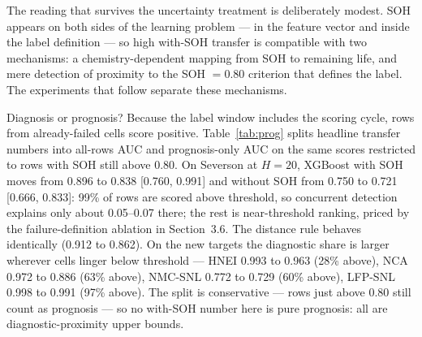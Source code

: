 \documentclass[preprint,12pt]{elsarticle}
\begin{document}
The reading that survives the uncertainty treatment is deliberately modest. SOH appears on both sides of the learning problem --- in the feature vector and inside the label definition --- so high with-SOH transfer is compatible with two mechanisms: a chemistry-dependent mapping from SOH to remaining life, and mere detection of proximity to the SOH $=0.80$ criterion that defines the label. The experiments that follow separate these mechanisms.

Diagnosis or prognosis? Because the label window includes the scoring cycle, rows from already-failed cells score positive. Table~\ref{tab:prog} splits headline transfer numbers into all-rows AUC and prognosis-only AUC on the same scores restricted to rows with SOH still above 0.80. On Severson at $H{=}20$, XGBoost with SOH moves from 0.896 to 0.838 [0.760, 0.991] and without SOH from 0.750 to 0.721 [0.666, 0.833]: 99\% of rows are scored above threshold, so concurrent detection explains only about 0.05--0.07 there; the rest is near-threshold ranking, priced by the failure-definition ablation in Section~3.6. The distance rule behaves identically (0.912 to 0.862). On the new targets the diagnostic share is larger wherever cells linger below threshold --- HNEI 0.993 to 0.963 (28\% above), NCA 0.972 to 0.886 (63\% above), NMC-SNL 0.772 to 0.729 (60\% above), LFP-SNL 0.998 to 0.991 (97\% above). The split is conservative --- rows just above 0.80 still count as prognosis --- so no with-SOH number here is pure prognosis: all are diagnostic-proximity upper bounds.
\end{document}
